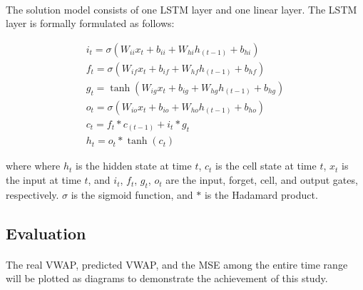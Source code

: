 \documentclass[12pt, letterpaper]{article}
\begin{document}
\paragraph{}
The solution model consists of one LSTM layer and one linear layer. The LSTM layer is formally formulated as follows:

\begin{equation*}
    \begin{array}{l}
        i_t = \sigma(W_{ii} x_t + b_{ii} + W_{hi} h_{(t-1)} + b_{hi}) \\
        f_t = \sigma(W_{if} x_t + b_{if} + W_{hf} h_{(t-1)} + b_{hf}) \\
        g_t = \tanh(W_{ig} x_t + b_{ig} + W_{hg} h_{(t-1)} + b_{hg}) \\
        o_t = \sigma(W_{io} x_t + b_{io} + W_{ho} h_{(t-1)} + b_{ho}) \\
        c_t = f_t * c_{(t-1)} + i_t * g_t \\
        h_t = o_t * \tanh(c_t)
    \end{array}
\end{equation*}

where where $h_t$ is the hidden state at time $t$, $c_t$ is the cell state at time $t$, $x_t$ is the input at time $t$, and $i_t$, $f_t$, $g_t$, $o_t$ are the input, forget, cell, and output gates, respectively. $\sigma$ is the sigmoid function, and $*$ is the Hadamard product.

\subsection{Evaluation}

\paragraph{}
The real VWAP, predicted VWAP, and the MSE among the entire time range will be plotted as diagrams to demonstrate the achievement of this study.
\end{document}

